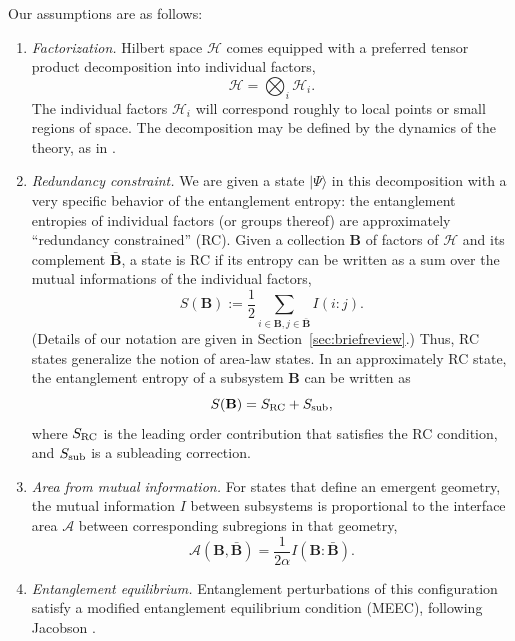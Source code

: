 \documentclass[%
12pt,preprint,
nofootinbib,
amsmath,amssymb,
aps,
prd,
showpacs,
superscriptaddress
]{revtex4-2}
\newcommand{\area}{\mathcal{A}}
\DeclareMathOperator{\co}{:}
\begin{document}
Our assumptions are as follows:
\begin{enumerate}[label=\textnormal{(A\arabic*)}]
\item \emph{Factorization.} Hilbert space $\mathcal{H}$ comes equipped with a preferred tensor product decomposition into individual factors,
 \begin{equation}
 \mathcal{H}=\bigotimes_i \mathcal{H}_i.
 \label{eqn:tensordecomp}
 \end{equation} 
 The individual factors $\mathcal{H}_i$ will correspond roughly to local points or small regions of space.
 The decomposition may be defined by the dynamics of the theory, as in \cite{Cotler:2017abq}.
 \label{itm:1}
\item \emph{Redundancy constraint.} We are given a state $|\Psi\rangle$ in this decomposition with a very specific behavior of the entanglement entropy: the entanglement entropies of individual factors (or groups thereof) are approximately ``redundancy constrained'' (RC). 
Given a collection $\textbf{B}$ of factors of $\mathcal{H}$ and its complement $\bar{\textbf{B}}$, a state is RC if its entropy can be written as a sum over the mutual informations of the individual factors,
  \begin{equation}
  S(\textbf{B}):=\frac 1 2 \sum_{i\in\textbf{B},j\in\bar{\textbf{B}}} I(i\co j).
 \label{eqn:RC}
 \end{equation}
 (Details of our notation are given in Section~\ref{sec:briefreview}.)
 Thus, RC states generalize the notion of area-law states.
 In an approximately RC state, the entanglement entropy of a subsystem $\mathbf{B}$ can be written as 
 \begin{equation}
 S(\mathbf{B}) = S_{\rm RC} +S_{\rm sub},
 \label{eqn:approxRC}
 \end{equation}
 where $S_{\rm RC}$ is the leading order contribution that satisfies the RC condition, and $S_{\rm sub}$ is a subleading correction. \label{itm:2}
\item \emph{Area from mutual information.} For states that define an emergent geometry, the mutual information $I$ between subsystems is proportional to the interface area $\area$ between corresponding subregions in that geometry, \label{itm:3}
\begin{equation}
 {\area}(\mathbf{B}, \bar{\mathbf{B}}) = \frac{1}{2\alpha} I(\mathbf{B} \co  \bar{\mathbf{B}}).
\end{equation}
 \item \emph{Entanglement equilibrium.} Entanglement perturbations of this configuration satisfy a modified entanglement equilibrium condition (MEEC), following Jacobson \cite{Jacobson:2015hqa}.

\end{enumerate}
\end{document}
